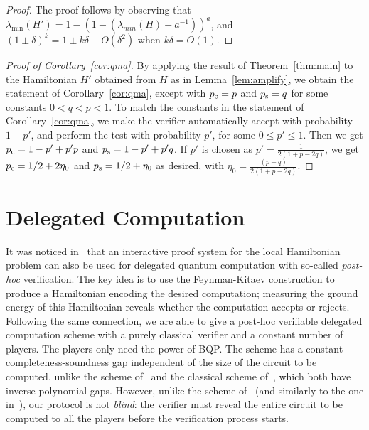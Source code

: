 \documentclass[11pt,letterpaper]{article}
\newcommand{\<}{\langle}
\renewcommand{\>}{\rangle}
\begin{document}
\begin{proof}
The proof follows by observing that $\lambda_{\min}(H') = 1 - (1 - (\lambda_{min}(H) - a^{-1}))^a$, and $(1 \pm \delta)^k = 1 \pm k\delta +
  O(\delta^2)$ when $k\delta = O(1)$. 
\end{proof}

\begin{proof}[Proof of Corollary~\ref{cor:qma}]
By applying the result of Theorem~\ref{thm:main} to the Hamiltonian $H'$ obtained from $H$ as in Lemma~\ref{lem:amplify}, we obtain the statement of Corollary~\ref{cor:qma}, except with $p_{\rm c} = p$ and $p_{\rm s} = q $ for some constants $0 < q < p < 1$. To match the constants in the statement of Corollary~\ref{cor:qma}, we make the verifier {automatically} accept with probability $1-p'$, and perform the test with probability $p'$, for some $0\leq p'\leq 1$. Then we get $p_{\rm c} = 1-p' +p'p $ and $p_{\rm s} = 1 - p' + p'q$. If $p'$ is chosen as $p' = \frac{1}{2(1 + p -2q)}$, we get $p_{\rm c} = 1/2 + 2\eta_0$ and $p_{\rm s} = 1/2 + \eta_0$ as desired, with $\eta_0 = \frac{(p-q)}{2(1 + p - 2q)}$.
\end{proof}

\section{Delegated Computation}
\label{sec:delegated}
It was noticed in~\cite{FitzsimonsH15} that an interactive proof system for the local Hamiltonian problem can also be used for delegated quantum computation with so-called \emph{post-hoc} verification. The key idea is to use the Feynman-Kitaev construction to produce a Hamiltonian encoding the desired computation; measuring the ground energy of this Hamiltonian reveals whether the computation accepts or rejects. 
Following the same connection, we are able to give a post-hoc verifiable delegated computation scheme with a purely classical verifier and a constant number of players. The players only need the power of BQP. The scheme has a constant completeness-soundness gap independent of the size of the circuit to be computed, unlike the scheme of~\cite{FitzsimonsH15} and the classical scheme of~\cite{ReichardtUV13nature}, which both have inverse-polynomial gaps. However, unlike the scheme of~\cite{ReichardtUV13nature} (and similarly to the one in~\cite{FitzsimonsH15}), our protocol is not \emph{blind}: the verifier must reveal the entire circuit to be computed to all the players before the verification process starts.
\end{document}
